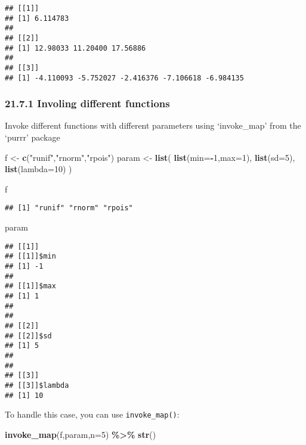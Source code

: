 \documentclass[
]{article}
\newenvironment{Shaded}{\begin{snugshade}}{\end{snugshade}}
\newcommand{\AttributeTok}[1]{\textcolor[rgb]{0.13,0.29,0.53}{#1}}
\newcommand{\DecValTok}[1]{\textcolor[rgb]{0.00,0.00,0.81}{#1}}
\newcommand{\FunctionTok}[1]{\textcolor[rgb]{0.13,0.29,0.53}{\textbf{#1}}}
\newcommand{\NormalTok}[1]{#1}
\newcommand{\OtherTok}[1]{\textcolor[rgb]{0.56,0.35,0.01}{#1}}
\newcommand{\SpecialCharTok}[1]{\textcolor[rgb]{0.81,0.36,0.00}{\textbf{#1}}}
\newcommand{\StringTok}[1]{\textcolor[rgb]{0.31,0.60,0.02}{#1}}
\begin{document}
\begin{verbatim}
## [[1]]
## [1] 6.114783
## 
## [[2]]
## [1] 12.98033 11.20400 17.56886
## 
## [[3]]
## [1] -4.110093 -5.752027 -2.416376 -7.106618 -6.984135
\end{verbatim}

\hypertarget{involing-different-functions}{%
\subsubsection{21.7.1 Involing different
functions}\label{involing-different-functions}}

Invoke different functions with different parameters using `invoke\_map'
from the `purrr' package

\begin{Shaded}
\begin{Highlighting}[]
\NormalTok{f }\OtherTok{\textless{}{-}} \FunctionTok{c}\NormalTok{(}\StringTok{"runif"}\NormalTok{,}\StringTok{"rnorm"}\NormalTok{,}\StringTok{"rpois"}\NormalTok{)}
\NormalTok{param }\OtherTok{\textless{}{-}} \FunctionTok{list}\NormalTok{(}
  \FunctionTok{list}\NormalTok{(}\AttributeTok{min=}\SpecialCharTok{{-}}\DecValTok{1}\NormalTok{,}\AttributeTok{max=}\DecValTok{1}\NormalTok{),}
  \FunctionTok{list}\NormalTok{(}\AttributeTok{sd=}\DecValTok{5}\NormalTok{),}
  \FunctionTok{list}\NormalTok{(}\AttributeTok{lambda=}\DecValTok{10}\NormalTok{)}
\NormalTok{)}

\NormalTok{f}
\end{Highlighting}
\end{Shaded}

\begin{verbatim}
## [1] "runif" "rnorm" "rpois"
\end{verbatim}

\begin{Shaded}
\begin{Highlighting}[]
\NormalTok{param}
\end{Highlighting}
\end{Shaded}

\begin{verbatim}
## [[1]]
## [[1]]$min
## [1] -1
## 
## [[1]]$max
## [1] 1
## 
## 
## [[2]]
## [[2]]$sd
## [1] 5
## 
## 
## [[3]]
## [[3]]$lambda
## [1] 10
\end{verbatim}

To handle this case, you can use \texttt{invoke\_map()}:

\begin{Shaded}
\begin{Highlighting}[]
\FunctionTok{invoke\_map}\NormalTok{(f,param,}\AttributeTok{n=}\DecValTok{5}\NormalTok{) }\SpecialCharTok{\%\textgreater{}\%} 
  \FunctionTok{str}\NormalTok{()}
\end{Highlighting}
\end{Shaded}
\end{document}
